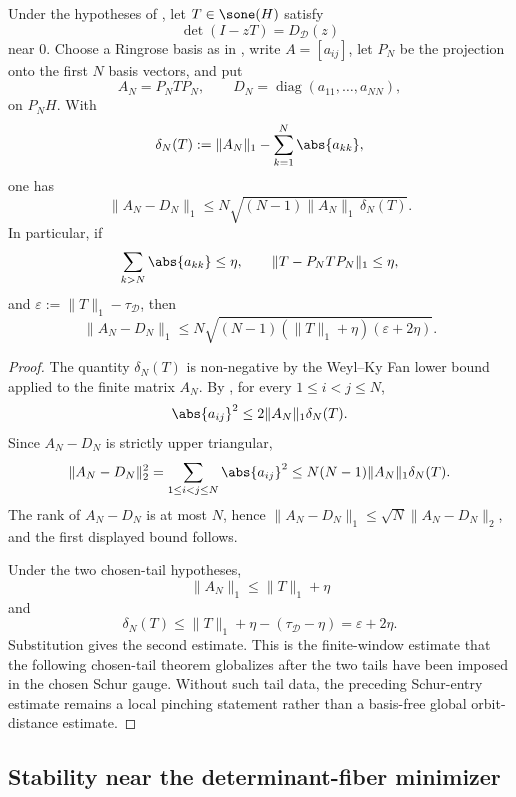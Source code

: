 \begin{proposition}
  \label{prop:finite-chosen-schur-window-distance-bound}
  Under the hypotheses of
  , let
  \(T\in\sone(H)\) satisfy
  \[
    \det(I-zT)=D_{\mathcal D}(z)
  \]
  near \(0\). Choose a Ringrose basis as in
  , write \(A=[a_{ij}]\), let
  \(P_N\) be the projection onto the first \(N\) basis vectors, and put
  \[
    A_N=P_NTP_N,
    \qquad
    D_N=\operatorname{diag}(a_{11},\ldots,a_{NN}),
  \]
  on \(P_NH\). With
  \[
    \delta_N(T):=\|A_N\|_1-\sum_{k=1}^N\abs{a_{kk}},
  \]
  one has
  \[
    \|A_N-D_N\|_1
    \le
    N\sqrt{(N-1)\|A_N\|_1\,\delta_N(T)} .
  \]
  In particular, if
  \[
    \sum_{k>N}\abs{a_{kk}}\le\eta,
    \qquad
    \|T-P_NTP_N\|_1\le\eta,
  \]
  and \(\varepsilon:=\|T\|_1-\tau_{\mathcal D}\), then
  \[
    \|A_N-D_N\|_1
    \le
    N\sqrt{(N-1)(\|T\|_1+\eta)(\varepsilon+2\eta)} .
  \]
\end{proposition}

\begin{proof}
  The quantity \(\delta_N(T)\) is non-negative by the Weyl--Ky Fan lower
  bound applied to the finite matrix \(A_N\). By
  , for every \(1\le i<j\le N\),
  \[
    \abs{a_{ij}}^2\le 2\|A_N\|_1\delta_N(T).
  \]
  Since \(A_N-D_N\) is strictly upper triangular,
  \[
    \|A_N-D_N\|_2^2
    =\sum_{1\le i<j\le N}\abs{a_{ij}}^2
    \le N(N-1)\|A_N\|_1\delta_N(T).
  \]
  The rank of \(A_N-D_N\) is at most \(N\), hence
  \(\|A_N-D_N\|_1\le\sqrt N\|A_N-D_N\|_2\), and the first displayed bound
  follows.

  Under the two chosen-tail hypotheses,
  \[
    \|A_N\|_1\le\|T\|_1+\eta
  \]
  and
  \[
    \delta_N(T)
    \le \|T\|_1+\eta-(\tau_{\mathcal D}-\eta)
    =\varepsilon+2\eta .
  \]
  Substitution gives the second estimate. This is the finite-window
  estimate that the following chosen-tail theorem globalizes after the two
  tails have been imposed in the chosen Schur gauge. Without such tail data,
  the preceding Schur-entry estimate remains a local pinching statement rather
  than a basis-free global orbit-distance estimate.
\end{proof}

\subsection{Stability near the determinant-fiber minimizer}\label{sec:determinant-fiber-stability}

